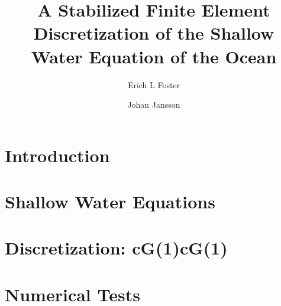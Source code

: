 \documentclass{elsarticle}
\begin{document}
  \begin{frontmatter}
    \author[1]{Erich L Foster}

    \author[1]{Johan Jansson}

    \address[1]{Basque Center for Applied Mathematics, Alameda Mazarredo, 14,
      48009 Bilbao, Basque Country -- Spain}

    \title{A Stabilized Finite Element Discretization of the Shallow Water Equation of the Ocean}

    \begin{abstract}
    \end{abstract}
  \end{frontmatter}

  \section{Introduction} \label{sec:Intro}
  

  \section{Shallow Water Equations}
  

  \section{Discretization: cG(1)cG(1)}
  

  \section{Numerical Tests}
  

  
  
\end{document}

